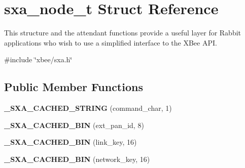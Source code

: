 \hypertarget{structsxa__node__t}{\section{sxa\-\_\-node\-\_\-t Struct Reference}
\label{structsxa__node__t}
}


This structure and the attendant functions provide a useful layer for Rabbit applications who wish to use a simplified interface to the X\-Bee A\-P\-I.  




{\ttfamily \#include \char`\"{}xbee/sxa.\-h\char`\"{}}

\subsection*{Public Member Functions}
\begin{DoxyCompactItemize}
\item 
\hypertarget{structsxa__node__t_a8e784384cf9ff8c8972ae68e501e05c4}{{\bfseries \-\_\-\-S\-X\-A\-\_\-\-C\-A\-C\-H\-E\-D\-\_\-\-S\-T\-R\-I\-N\-G} (command\-\_\-char, 1)}\label{structsxa__node__t_a8e784384cf9ff8c8972ae68e501e05c4}

\item 
\hypertarget{structsxa__node__t_a72344c6c328b655270d31a7aa74a0c7e}{{\bfseries \-\_\-\-S\-X\-A\-\_\-\-C\-A\-C\-H\-E\-D\-\_\-\-B\-I\-N} (ext\-\_\-pan\-\_\-id, 8)}\label{structsxa__node__t_a72344c6c328b655270d31a7aa74a0c7e}

\item 
\hypertarget{structsxa__node__t_a54caac55fa94d32e26c54447a064ebee}{{\bfseries \-\_\-\-S\-X\-A\-\_\-\-C\-A\-C\-H\-E\-D\-\_\-\-B\-I\-N} (link\-\_\-key, 16)}\label{structsxa__node__t_a54caac55fa94d32e26c54447a064ebee}

\item 
\hypertarget{structsxa__node__t_a18c56e9dac1d18c895c0989b85b583ae}{{\bfseries \-\_\-\-S\-X\-A\-\_\-\-C\-A\-C\-H\-E\-D\-\_\-\-B\-I\-N} (network\-\_\-key, 16)}\label{structsxa__node__t_a18c56e9dac1d18c895c0989b85b583ae}

\end{DoxyCompactItemize}

